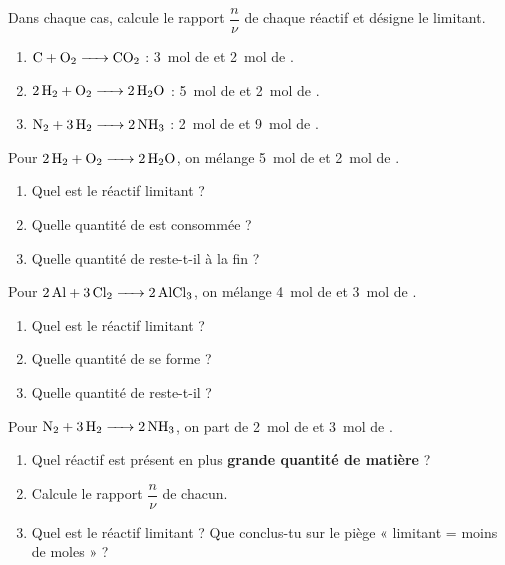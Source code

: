 \documentclass[11pt,a4paper]{article}
\begin{document}
\begin{exo}
Dans chaque cas, calcule le rapport $\dfrac{n}{\nu}$ de chaque réactif et désigne le limitant.
\begin{enumerate}[label=\alph*)]
  \item $\ce{C + O2 -> CO2}$ : \qty{3}{\mole} de  et \qty{2}{\mole} de .
  \item $\ce{2 H2 + O2 -> 2 H2O}$ : \qty{5}{\mole} de  et \qty{2}{\mole} de .
  \item $\ce{N2 + 3 H2 -> 2 NH3}$ : \qty{2}{\mole} de  et \qty{9}{\mole} de .
\end{enumerate}
\end{exo}

\begin{exo}
Pour $\ce{2 H2 + O2 -> 2 H2O}$, on mélange \qty{5}{\mole} de  et \qty{2}{\mole} de .
\begin{enumerate}[label=\alph*)]
  \item Quel est le réactif limitant ?
  \item Quelle quantité de  est consommée ?
  \item Quelle quantité de  reste-t-il à la fin ?
\end{enumerate}
\end{exo}

\begin{exo}
Pour $\ce{2 Al + 3 Cl2 -> 2 AlCl3}$, on mélange \qty{4}{\mole} de  et \qty{3}{\mole} de .
\begin{enumerate}[label=\alph*)]
  \item Quel est le réactif limitant ?
  \item Quelle quantité de  se forme ?
  \item Quelle quantité de  reste-t-il ?
\end{enumerate}
\end{exo}

\begin{exo}
Pour $\ce{N2 + 3 H2 -> 2 NH3}$, on part de \qty{2}{\mole} de  et \qty{3}{\mole} de .
\begin{enumerate}[label=\alph*)]
  \item Quel réactif est présent en plus \textbf{grande quantité de matière} ?
  \item Calcule le rapport $\dfrac{n}{\nu}$ de chacun.
  \item Quel est le réactif limitant ? Que conclus-tu sur le piège « limitant = moins de moles » ?
\end{enumerate}
\end{exo}
\end{document}
